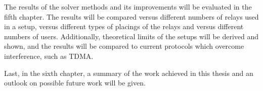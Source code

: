 The results of the solver methods and its improvements will be evaluated in the fifth chapter.
The results will be compared versus different numbers of relays used in a setup, versus different types of placings of the relays and versus different numbers of users.
Additionally, theoretical limits of the setups will be derived and shown, and the results will be compared to current protocols which overcome interference, such as TDMA.

Last, in the sixth chapter, a summary of the work achieved in this thesis and an outlook on possible future work will be given.







